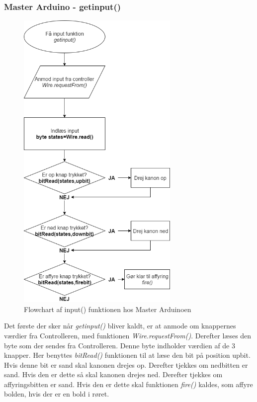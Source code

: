 \subsubsection{Master Arduino - getinput()}
\begin{figure}[H]
	\centering
    \includegraphics[height=15cm]{figures/arduino/M-getinput.PNG}
	\caption{Flowchart af input() funktionen hos Master Arduinoen}
	\label{flow:input}
\end{figure}
Det første der sker når \textit{getinput()} bliver kaldt, er at anmode om knappernes værdier fra Controlleren, med funktionen \textit{Wire.requestFrom()}. Derefter læses den byte som der sendes fra Controlleren. Denne byte indholder værdien af de 3 knapper. Her benyttes \textit{bitRead()} funktionen til at læse den bit på position upbit. Hvis denne bit er sand skal kanonen drejes op. Derefter tjekkes om nedbitten er sand. Hvis den er dette så skal kanonen drejes ned.
Derefter tjekkes om affyringsbitten er sand. Hvis den er dette skal funktionen \textit{fire()} kaldes, som affyre bolden, hvis der er en bold i røret.


